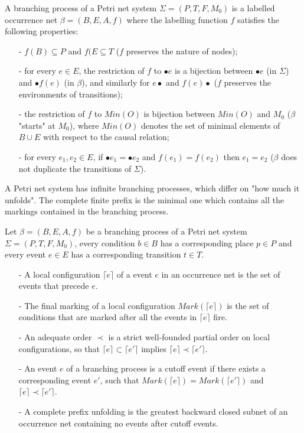 \documentclass{llncs}
\begin{document}
\begin{definition}\label{def:branchingProcess}
A branching process of a Petri net system $\Sigma=(P,T,F,M_{0})$ is a labelled occurrence net $\beta=(B,E,A,f)$ where the labelling function $f$ satisfies the following properties:
	\begin{itemize}
		\item[-] $f(B)\subseteq P$ and $f(E\subseteq T$ ($f$ preserves the nature of nodes);
		\item[-] for every $e\in E$, the restriction of $f$ to $\bullet e$ is a bijection between $\bullet e$ (in $\Sigma$) and $\bullet f(e)$ (in $\beta$), and similarly for $e\bullet$ and $f(e)\bullet$ ($f$ preserves the environments of transitions);
		\item[-] the restriction of $f$ to $Min(O)$ is bijection between $Min(O)$ and $M_{0}$ ($\beta$ "starts" at $M_{0}$), where $Min(O)$ denotes the set of minimal elements of $B\cup E$ with respect to the causal relation;
		\item[-] for every $e_{1},e_{2}\in E$, if $\bullet e_{1}=\bullet e_{2}$ and $f(e_{1})=f(e_{2})$ then $e_{1}=e_{2}$ ($\beta$ does not duplicate the transitions of $\Sigma$).
	\end{itemize}
\end{definition}

A Petri net system has infinite branching processes, which differ on "how much it unfolds". The complete finite prefix is the minimal one which contains all the markings contained in the branching process.

\begin{definition}\label{def:cpu}
Let $\beta=(B,E,A,f)$ be a branching process of a Petri net system $\Sigma=(P,T,F,M_{0})$, every condition $b\in B$ has a corresponding place $p\in P$ and every event $e\in E$ has a corresponding transition $t\in T$.
	\begin{itemize}
		\item[-] A local configuration $\lceil e\rceil$ of a event $e$ in an occurrence net is the set of events that precede $e$.
		\item[-] The final marking of a local configuration $Mark(\lceil e\rceil)$ is the set of conditions that are marked after all the events in $\lceil e\rceil$ fire.
		\item[-] An adequate order $\prec$ is a strict well-founded partial order on local configurations, so that $\lceil e\rceil\subset\lceil e'\rceil$ implies $\lceil e\rceil\prec\lceil e'\rceil$.
		\item[-] An event $e$ of a branching process is a cutoff event if there exists a corresponding event $e'$, such that $Mark(\lceil e\rceil)=Mark(\lceil e'\rceil)$ and $\lceil e\rceil\prec\lceil e'\rceil$.
		\item[-] A complete prefix unfolding is the greatest backward closed subnet of an occurrence net containing no events after cutoff events.
	\end{itemize}
\end{definition}
\end{document}
